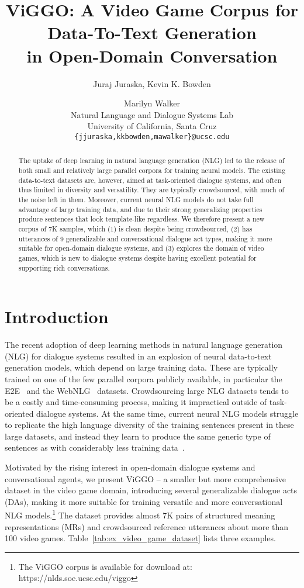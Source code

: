 \documentclass[11pt,a4paper]{article}
\title{ViGGO: A Video Game Corpus for Data-To-Text Generation\\in Open-Domain Conversation}
\author{Juraj Juraska, Kevin K. Bowden \and Marilyn Walker \\
Natural Language and Dialogue Systems Lab \\
University of California, Santa Cruz \\
{\tt \{jjuraska,kkbowden,mawalker\}@ucsc.edu} \\}
\date{}
\begin{document}
\maketitle

\begin{abstract}

The uptake of deep learning in natural language generation (NLG) led to the release of both small and relatively large parallel corpora for training neural models. The existing data-to-text datasets are, however, aimed at task-oriented dialogue systems, and often thus limited in diversity and versatility. They are typically crowdsourced, with much of the noise left in them. Moreover, current neural NLG models do not take full advantage of large training data, and due to their strong generalizing properties produce sentences that look template-like regardless. We therefore present a new corpus of 7K samples, which (1) is clean despite being crowdsourced, (2) has utterances of 9 generalizable and conversational dialogue act types, making it more suitable for open-domain dialogue systems, and (3) explores the domain of video games, which is new to dialogue systems despite having excellent potential for supporting rich conversations.

\end{abstract}



\section{Introduction}
\label{sec:intro}


The recent adoption of deep learning methods in natural language generation (NLG) for dialogue systems resulted in an explosion of neural data-to-text generation models, which depend on large training data. These are typically trained on one of the few parallel corpora publicly available, in particular the E2E~\cite{novikova2017e2e} and the WebNLG~\cite{gardent2017creating} datasets. Crowdsourcing large NLG datasets tends to be a costly and time-consuming process, making it impractical outside of task-oriented dialogue systems. At the same time, current neural NLG models struggle to replicate the high language diversity of the training sentences present in these large datasets, and instead they learn to produce the same generic type of sentences as with considerably less training data~\cite{deriu2018syntactic,juraska2018characterizing,duvsek2019evaluating}.

Motivated by the rising interest in open-domain dialogue systems and conversational agents, we present ViGGO -- a smaller but more comprehensive dataset in the video game domain, introducing several generalizable dialogue acts (DAs), making it more suitable for training versatile and more conversational NLG models.\footnote{The ViGGO corpus is available for download at: https://nlds.soe.ucsc.edu/viggo}
The dataset provides almost 7K pairs of structured meaning representations (MRs) and crowdsourced reference utterances about more than 100 video games. Table~\ref{tab:ex_video_game_dataset} lists three examples.
\end{document}
